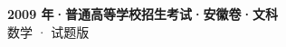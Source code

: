 \documentclass[zihao=-4, a4paper]{ctexart}
\begin{document}
\begin{center}
  {\Large\bfseries 2009 年·普通高等学校招生考试·安徽卷·文科}\\[4pt]
  {\large 数学 · 试题版}
\end{center}
\medskip
{}

\end{document}
